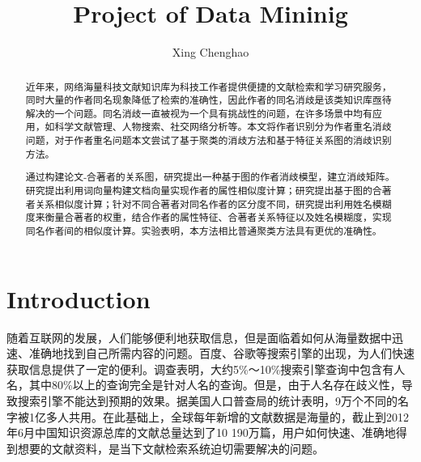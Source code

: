 \documentclass[sigchi]{acmart}
\begin{document}
\title{Project of Data Mininig}

\author{Xing Chenghao}
\authornotemark[1]


\begin{abstract}
    近年来，网络海量科技文献知识库为科技工作者提供便捷的文献检索和学习研究服务，同时大量的作者同名现象降低了检索的准确性，因此作者的同名消歧是该类知识库亟待解决的一个问题\cite{李琦马军-460}。同名消歧一直被视为一个具有挑战性的问题，在许多场景中均有应用，如科学文献管理、人物搜索、社交网络分析等。本文将作者识别分为作者重名消歧问题，对于作者重名问题本文尝试了基于聚类的消歧方法和基于特征关系图的消歧识别方法。

    通过构建论文-合著者的关系图，研究提出一种基于图的作者消歧模型，建立消歧矩阵。研究提出利用词向量构建文档向量实现作者的属性相似度计算；研究提出基于图的合著者关系相似度计算；针对不同合著者对同名作者的区分度不同，研究提出利用姓名模糊度来衡量合著者的权重，结合作者的属性特征、合著者关系特征以及姓名模糊度，实现同名作者间的相似度计算。实验表明，本方法相比普通聚类方法具有更优的准确性。
    
\end{abstract}




\maketitle

\section{Introduction}
随着互联网的发展，人们能够便利地获取信息，但是面临着如何从海量数据中迅速、准确地找到自己所需内容的问题。百度、谷歌等搜索引擎的出现，为人们快速获取信息提供了一定的便利。调查表明，大约5\%～10\%搜索引擎查询中包含有人名，其中80\%以上的查询完全是针对人名的查询。但是，由于人名存在歧义性，导致搜索引擎不能达到预期的效果。据美国人口普查局的统计表明，9万个不同的名字被1亿多人共用\cite{宋文强-455}。在此基础上，全球每年新增的文献数据是海量的，截止到2012年6月中国知识资源总库的文献总量达到了10 190万篇，用户如何快速、准确地得到想要的文献资料，是当下文献检索系统迫切需要解决的问题。
\end{document}
